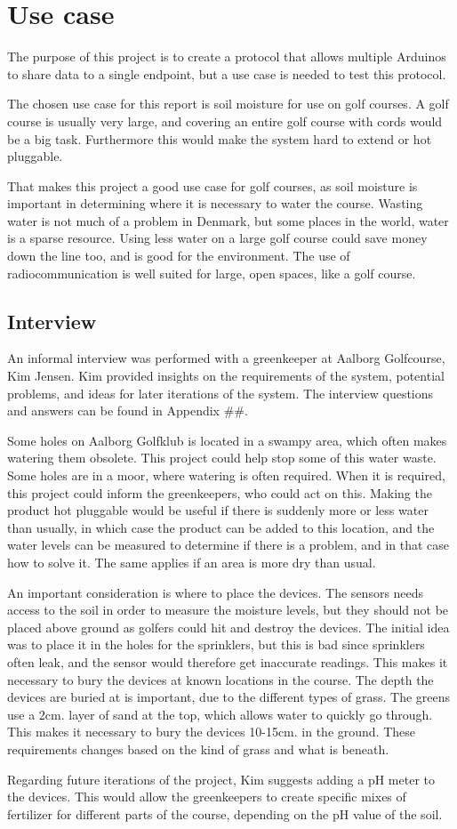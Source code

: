 \chapter{Use case}
The purpose of this project is to create a protocol that allows multiple Arduinos to share data to a single endpoint, but a use case is needed to test this protocol.

The chosen use case for this report is soil moisture for use on golf courses. A golf course is usually very large, and covering an entire golf course with cords would be a big task. Furthermore this would make the system hard to extend or hot pluggable.

That makes this project a good use case for golf courses, as soil moisture is important in determining where it is necessary to water the course. Wasting water is not much of a problem in Denmark, but some places in the world, water is a sparse resource. Using less water on a large golf course could save money down the line too, and is good for the environment. The use of radiocommunication is well suited for large, open spaces, like a golf course.

\section{Interview}
An informal interview was performed with a greenkeeper at Aalborg Golfcourse, Kim Jensen. Kim provided insights on the requirements of the system, potential problems, and ideas for later iterations of the system. The interview questions and answers can be found in Appendix \#\#. 

Some holes on Aalborg Golfklub is located in a swampy area, which often makes watering them obsolete. This project could help stop some of this water waste. Some holes are in a moor, where watering is often required. When it is required, this project could inform the greenkeepers, who could act on this.
Making the product hot pluggable would be useful if there is suddenly more or less water than usually, in which case the product can be added to this location, and the water levels can be measured to determine if there is a problem, and in that case how to solve it. The same applies if an area is more dry than usual.

An important consideration is where to place the devices. The sensors needs access to the soil in order to measure the moisture levels, but they should not be placed above ground as golfers could hit and destroy the devices. The initial idea was to place it in the holes for the sprinklers, but this is bad since sprinklers often leak, and the sensor would therefore get inaccurate readings.
This makes it necessary to bury the devices at known locations in the course. The depth the devices are buried at is important, due to the different types of grass. The greens use a 2cm. layer of sand at the top, which allows water to quickly go through. This makes it necessary to bury the devices 10-15cm. in the ground. These requirements changes based on the kind of grass and what is beneath.

Regarding future iterations of the project, Kim suggests adding a pH meter to the devices. This would allow the greenkeepers to create specific mixes of fertilizer for different parts of the course, depending on the pH value of the soil. 